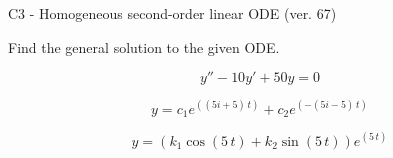 \begin{exercise}
  \begin{exerciseTitle}C3 - Homogeneous second-order linear ODE (ver. 67)\end{exerciseTitle}
  \begin{exerciseStatement}
    
Find the general solution to the given ODE.

    
\[y''-10y'+50y = 0\]

  \end{exerciseStatement}
  \begin{exerciseAnswer}
    
\[y= c_{1} e^{\left(\left(5 i + 5\right) \, t\right)} + c_{2} e^{\left(-\left(5 i - 5\right) \, t\right)}\]

    
\[y= {\left(k_{1} \cos\left(5 \, t\right) + k_{2} \sin\left(5 \, t\right)\right)} e^{\left(5 \, t\right)}\]

  \end{exerciseAnswer}
\end{exercise}